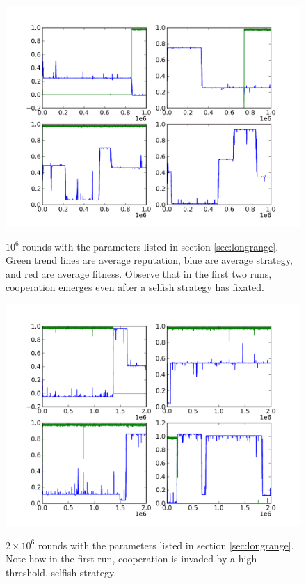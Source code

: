 \documentclass{amsart}
\begin{document}
\begin{figure}[h]
\caption{$10^6$ rounds with the parameters listed in section
  \ref{sec:longrange}. Green trend lines are average reputation, blue
  are average strategy, and red are average fitness. Observe that in
  the first two runs, cooperation emerges even after a selfish
  strategy has fixated.}

\includegraphics[width=\textwidth]{really.png}
\label{fig:really}
\end{figure}
\begin{figure}[h]
\caption{$2 \times 10^6$ rounds with the parameters listed in section
  \ref{sec:longrange}. Note how in the first run, cooperation is
  invaded by a high-threshold, selfish strategy.}

\includegraphics[width=\textwidth]{what.png}
\label{fig:what}
\end{figure}
\end{document}
